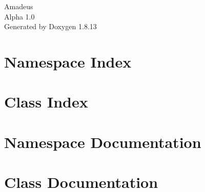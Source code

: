 \documentclass[twoside]{book}
\newcommand{\+}{\discretionary{\mbox{\scriptsize$\hookleftarrow$}}{}{}}
\newcommand{\clearemptydoublepage}{%
  \newpage{\pagestyle{empty}\cleardoublepage}%
}
\begin{document}
\hypersetup{pageanchor=false,
             bookmarksnumbered=true,
             pdfencoding=unicode
            }
\begin{titlepage}
\vspace*{7cm}
\begin{center}%
{\Large Amadeus \\[1ex]\large Alpha 1.\+0 }\\
\vspace*{1cm}
{\large Generated by Doxygen 1.8.13}\\
\end{center}
\end{titlepage}
\clearemptydoublepage
{}
\tableofcontents
\clearemptydoublepage
{}
\hypersetup{pageanchor=true}

\chapter{Namespace Index}

\chapter{Class Index}

\chapter{Namespace Documentation}

\chapter{Class Documentation}






























\backmatter
\newpage
{}
\clearemptydoublepage
{}
\printindex
\end{document}
